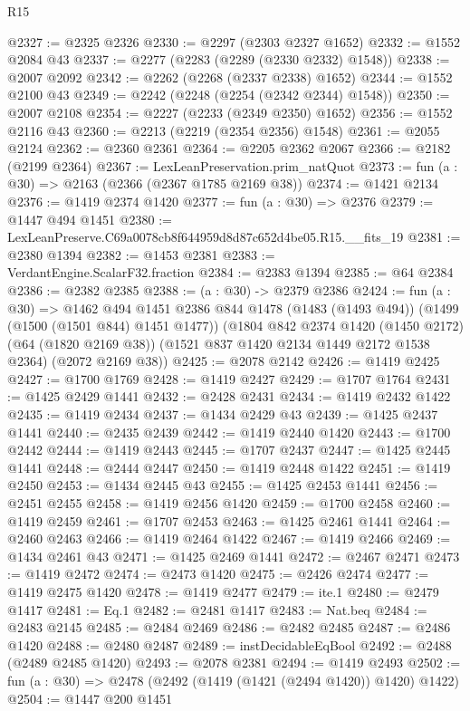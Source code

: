 \begin{lexlean}{R15}
\begin{coremodule}
@2327 := @2325 @2326
@2330 := @2297 (@2303 @2327 @1652)
@2332 := @1552 @2084 @43
@2337 := @2277 (@2283 (@2289 (@2330 @2332) @1548))
@2338 := @2007 @2092
@2342 := @2262 (@2268 (@2337 @2338) @1652)
@2344 := @1552 @2100 @43
@2349 := @2242 (@2248 (@2254 (@2342 @2344) @1548))
@2350 := @2007 @2108
@2354 := @2227 (@2233 (@2349 @2350) @1652)
@2356 := @1552 @2116 @43
@2360 := @2213 (@2219 (@2354 @2356) @1548)
@2361 := @2055 @2124
@2362 := @2360 @2361
@2364 := @2205 @2362 @2067
@2366 := @2182 (@2199 @2364)
@2367 := LexLeanPreservation.prim_natQuot
@2373 := fun (a : @30) => @2163 (@2366 (@2367 @1785 @2169 @38))
@2374 := @1421 @2134
@2376 := @1419 @2374 @1420
@2377 := fun (a : @30) => @2376
@2379 := @1447 @494 @1451
@2380 := LexLeanPreserve.C69a0078cb8f644959d8d87c652d4be05.R15.__fits_19
@2381 := @2380 @1394
@2382 := @1453 @2381
@2383 := VerdantEngine.ScalarF32.fraction
@2384 := @2383 @1394
@2385 := @64 @2384
@2386 := @2382 @2385
@2388 := (a : @30) -> @2379 @2386
@2424 := fun (a : @30) =>
  @1462
    @494
    @1451
    @2386
    @844
    @1478
    (@1483 (@1493 @494))
    (@1499 (@1500 (@1501 @844) @1451 @1477))
    (@1804
      @842
      @2374
      @1420
      (@1450 @2172)
      (@64 (@1820 @2169 @38))
      (@1521 @837 @1420 @2134 @1449 @2172 @1538 @2364)
      (@2072 @2169 @38))
@2425 := @2078 @2142
@2426 := @1419 @2425
@2427 := @1700 @1769
@2428 := @1419 @2427
@2429 := @1707 @1764
@2431 := @1425 @2429 @1441
@2432 := @2428 @2431
@2434 := @1419 @2432 @1422
@2435 := @1419 @2434
@2437 := @1434 @2429 @43
@2439 := @1425 @2437 @1441
@2440 := @2435 @2439
@2442 := @1419 @2440 @1420
@2443 := @1700 @2442
@2444 := @1419 @2443
@2445 := @1707 @2437
@2447 := @1425 @2445 @1441
@2448 := @2444 @2447
@2450 := @1419 @2448 @1422
@2451 := @1419 @2450
@2453 := @1434 @2445 @43
@2455 := @1425 @2453 @1441
@2456 := @2451 @2455
@2458 := @1419 @2456 @1420
@2459 := @1700 @2458
@2460 := @1419 @2459
@2461 := @1707 @2453
@2463 := @1425 @2461 @1441
@2464 := @2460 @2463
@2466 := @1419 @2464 @1422
@2467 := @1419 @2466
@2469 := @1434 @2461 @43
@2471 := @1425 @2469 @1441
@2472 := @2467 @2471
@2473 := @1419 @2472
@2474 := @2473 @1420
@2475 := @2426 @2474
@2477 := @1419 @2475 @1420
@2478 := @1419 @2477
@2479 := ite.{1}
@2480 := @2479 @1417
@2481 := Eq.{1}
@2482 := @2481 @1417
@2483 := Nat.beq
@2484 := @2483 @2145
@2485 := @2484 @2469
@2486 := @2482 @2485
@2487 := @2486 @1420
@2488 := @2480 @2487
@2489 := instDecidableEqBool
@2492 := @2488 (@2489 @2485 @1420)
@2493 := @2078 @2381
@2494 := @1419 @2493
@2502 := fun (a : @30) => @2478 (@2492 (@1419 (@1421 (@2494 @1420)) @1420) @1422)
@2504 := @1447 @200 @1451

\end{coremodule}
\end{lexlean}
